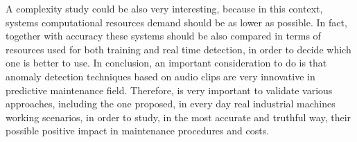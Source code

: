 A complexity study could be also very interesting, because in this context, systems computational resources demand should be as lower as possible. In fact, together with accuracy these systems should be also compared in terms of resources used for both training and real time detection, in order to decide which one is better to use.
In conclusion, an important consideration to do is that anomaly detection techniques based on audio clips are very innovative in predictive maintenance field. Therefore, is very important to validate various approaches, including the one proposed, in every day real industrial machines working scenarios, in order to study, in the most accurate and truthful way, their possible positive impact in maintenance procedures and costs.